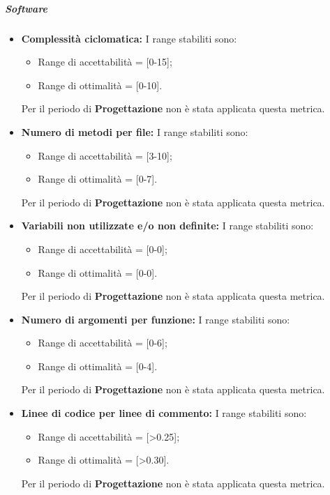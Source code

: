 \subparagraph{Software}
\begin{itemize}
\item \textbf{Complessità ciclomatica: }I range stabiliti sono:
      \begin{itemize}
        \item Range di accettabilità = [0-15];
        \item Range di ottimalità = [0-10].
      \end{itemize}
Per il periodo di \textbf{Progettazione} non è stata applicata questa metrica.

\item \textbf{Numero di metodi per file: }I range stabiliti sono:
      \begin{itemize}
        \item Range di accettabilità = [3-10];
        \item Range di ottimalità = [0-7].
      \end{itemize}
Per il periodo di \textbf{Progettazione} non è stata applicata questa metrica.

\item \textbf{Variabili non utilizzate e/o non definite: }I range stabiliti sono:
      \begin{itemize}
        \item Range di accettabilità = [0-0];
        \item Range di ottimalità = [0-0].
      \end{itemize}
Per il periodo di \textbf{Progettazione} non è stata applicata questa metrica.

\item \textbf{Numero di argomenti per funzione: }I range stabiliti sono:
      \begin{itemize}
        \item Range di accettabilità = [0-6];
        \item Range di ottimalità = [0-4].
      \end{itemize}
Per il periodo di \textbf{Progettazione} non è stata applicata questa metrica.

\item \textbf{Linee di codice per linee di commento: } I range stabiliti sono:
      \begin{itemize}
        \item Range di accettabilità = [>0.25];
        \item Range di ottimalità = [>0.30].
      \end{itemize}
Per il periodo di \textbf{Progettazione} non è stata applicata questa metrica.
\end{itemize}

